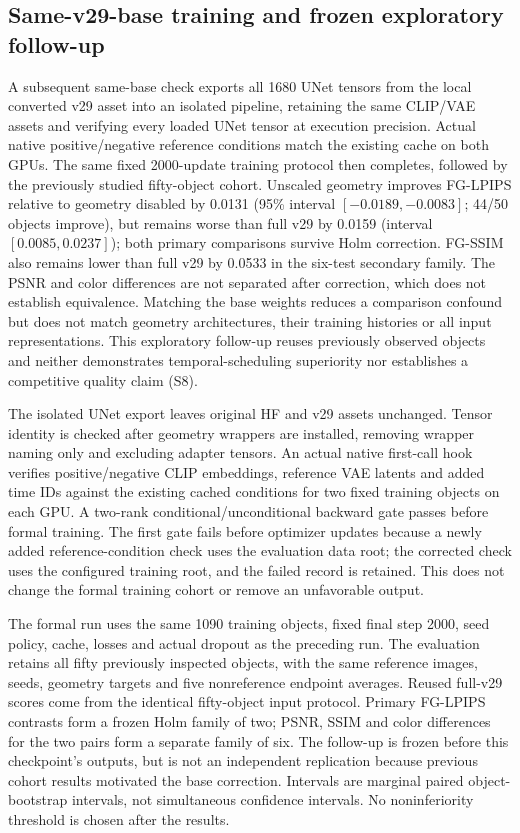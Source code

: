 \documentclass[11pt]{article}
\begin{document}
\subsection*{Same-v29-base training and frozen exploratory follow-up}
A subsequent same-base check exports all 1680 UNet tensors from the local converted v29 asset into an isolated pipeline, retaining the same CLIP/VAE assets and verifying every loaded UNet tensor at execution precision. Actual native positive/negative reference conditions match the existing cache on both GPUs. The same fixed 2000-update training protocol then completes, followed by the previously studied fifty-object cohort. Unscaled geometry improves FG-LPIPS relative to geometry disabled by 0.0131 (95\% interval $[-0.0189,-0.0083]$; 44/50 objects improve), but remains worse than full v29 by 0.0159 (interval $[0.0085,0.0237]$); both primary comparisons survive Holm correction. FG-SSIM also remains lower than full v29 by 0.0533 in the six-test secondary family. The PSNR and color differences are not separated after correction, which does not establish equivalence. Matching the base weights reduces a comparison confound but does not match geometry architectures, their training histories or all input representations. This exploratory follow-up reuses previously observed objects and neither demonstrates temporal-scheduling superiority nor establishes a competitive quality claim (S8).

The isolated UNet export leaves original HF and v29 assets unchanged. Tensor identity is checked after geometry wrappers are installed, removing wrapper naming only and excluding adapter tensors. An actual native first-call hook verifies positive/negative CLIP embeddings, reference VAE latents and added time IDs against the existing cached conditions for two fixed training objects on each GPU. A two-rank conditional/\allowbreak unconditional backward gate passes before formal training. The first gate fails before optimizer updates because a newly added reference-condition check uses the evaluation data root; the corrected check uses the configured training root, and the failed record is retained. This does not change the formal training cohort or remove an unfavorable output.

The formal run uses the same 1090 training objects, fixed final step 2000, seed policy, cache, losses and actual dropout as the preceding run. The evaluation retains all fifty previously inspected objects, with the same reference images, seeds, geometry targets and five nonreference endpoint averages. Reused full-v29 scores come from the identical fifty-object input protocol. Primary FG-LPIPS contrasts form a frozen Holm family of two; PSNR, SSIM and color differences for the two pairs form a separate family of six. The follow-up is frozen before this checkpoint's outputs, but is not an independent replication because previous cohort results motivated the base correction. Intervals are marginal paired object-bootstrap intervals, not simultaneous confidence intervals. No noninferiority threshold is chosen after the results.
\end{document}
